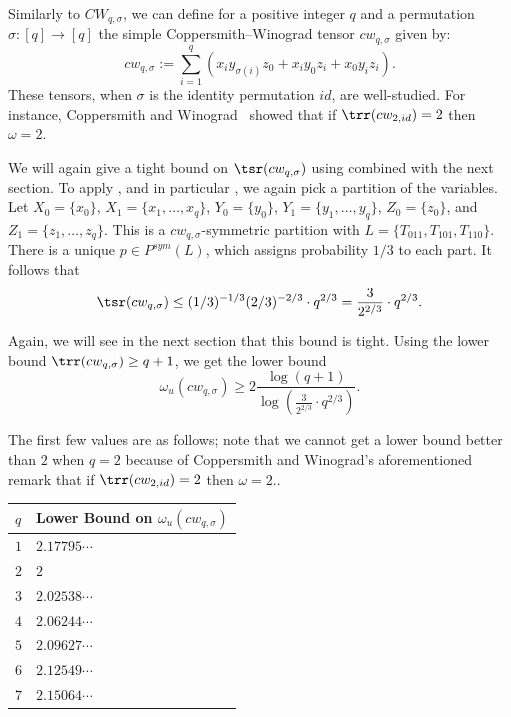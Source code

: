 \documentclass{toc}
\begin{document}
Similarly to $CW_{q,\sigma}$, we can define for a positive integer $q$ and a permutation $\sigma : [q] \to [q]$ the simple Coppersmith--Winograd tensor $cw_{q,\sigma}$ given by:
$$cw_{q,\sigma} := \sum_{i=1}^q (x_i y_{\sigma(i)} z_0 + x_i y_0 z_i + x_0 y_i z_i).$$
These tensors, when $\sigma$ is the identity permutation $id$, are well-studied. For instance, Coppersmith and Winograd~\cite{coppersmith} showed that if $\trr(cw_{2,id}) = 2$ then $\omega=2$.

We will again give a tight bound on $\tsr(cw_{q,\sigma})$ using  combined with the next section. To apply , and in particular , we again pick a partition of the variables. Let $X_0 = \{ x_0 \}$, $X_1 = \{ x_1, \ldots, x_q \}$, $Y_0 = \{ y_0 \}$, $Y_1 = \{ y_1, \ldots, y_q \}$,  $Z_0 = \{ z_0 \}$, and $Z_1 = \{ z_1, \ldots, z_q \}$. This is a $cw_{q,\sigma}$-symmetric partition with $L = \{ T_{011}, T_{101}, T_{110} \}$. There is a unique $p \in P^{sym}(L)$, which assigns probability $1/3$ to each part. It follows that
$$\tsr(cw_{q,\sigma}) \leq (1/3)^{-1/3} (2/3)^{-2/3} \cdot q^{2/3} = \frac{3}{2^{2/3}} \cdot q^{2/3}.$$

Again, we will see in the next section that this bound is tight. Using the lower bound $\trr(cw_{q,\sigma}) \geq q+1$, we get the lower bound
$$\omega_u(cw_{q,\sigma}) \geq 2 \frac{\log(q+1) }{ \log\left(\frac{3}{2^{2/3}} \cdot q^{2/3}\right)}.$$

The first few values are as follows; note that we cannot get a lower bound better than $2$ when $q=2$ because of Coppersmith and Winograd's aforementioned remark that if $\trr(cw_{2,id}) = 2$ then $\omega=2$..

\begin{center}
\begin{tabular}{l|l}
$q$ & Lower Bound on $\omega_u(cw_{q,\sigma})$ \\ \hline
$1$                                & $2.17795\cdots$                                                        \\
$2$                                & $2$                                                        \\
$3$                                & $2.02538\cdots$                                                        \\
$4$                                & $2.06244\cdots$                                                        \\
$5$                                & $2.09627\cdots$                                                           \\
$6$                                & $2.12549\cdots$                                                       \\
$7$                                & $2.15064\cdots$                                                   
\end{tabular}
\end{center}
\end{document}
